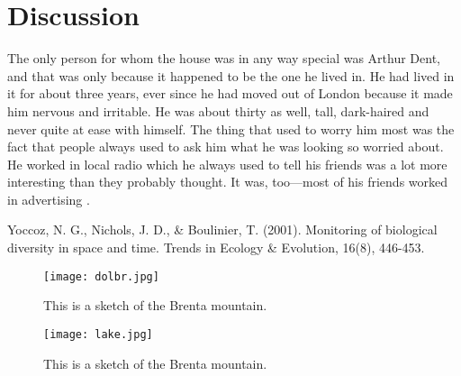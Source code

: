 \documentclass[a4paper, 12pt]{article}
\begin{document}
\section{Discussion}
The only person for whom the house was in any way special was Arthur Dent, and that was only because it happened to be the one he lived in. He had lived in it for about three years, ever since he had moved out of London because it made him nervous and irritable. He was about thirty as well, tall, dark-haired and never quite at ease with himself. The thing that used to worry him most was the fact that people always used to ask him what he was looking so worried about. He worked in local radio which he always used to tell his friends was a lot more interesting than they probably thought. It was, too—most of his friends worked in advertising \citep{yoccoz2001}.
\begin{thebibliography}{999}
    Yoccoz, N. G., Nichols, J. D., \& Boulinier, T. (2001). Monitoring of biological diversity in space and time. Trends in Ecology \& Evolution, 16(8), 446-453.
\end{thebibliography}
\begin{figure}
    \centering
    \texttt{[image: dolbr.jpg]}
    \caption{This is a sketch of the Brenta mountain.} %
    \label{fig:brenta} %
\end{figure}

\begin{figure}
    \centering
    \texttt{[image: lake.jpg]}
    \caption{This is a sketch of the Brenta mountain.}
    \label{fig:lake}
\end{figure}
\end{document}
